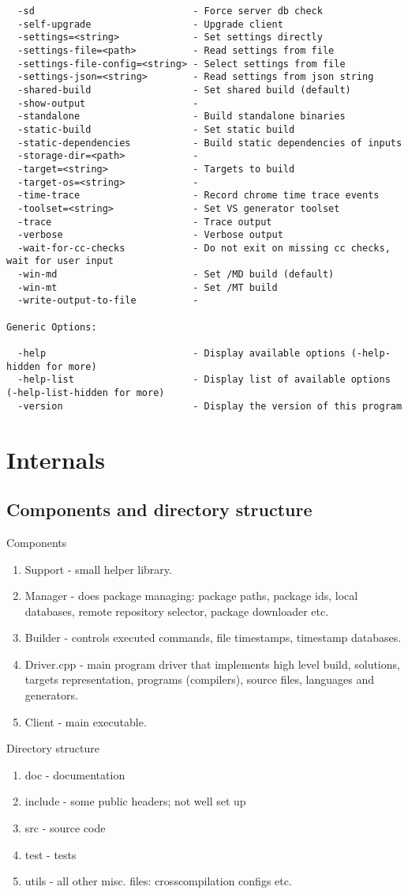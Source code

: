 \begin{verbatim}
  -sd                            - Force server db check
  -self-upgrade                  - Upgrade client
  -settings=<string>             - Set settings directly
  -settings-file=<path>          - Read settings from file
  -settings-file-config=<string> - Select settings from file
  -settings-json=<string>        - Read settings from json string
  -shared-build                  - Set shared build (default)
  -show-output                   -
  -standalone                    - Build standalone binaries
  -static-build                  - Set static build
  -static-dependencies           - Build static dependencies of inputs
  -storage-dir=<path>            -
  -target=<string>               - Targets to build
  -target-os=<string>            -
  -time-trace                    - Record chrome time trace events
  -toolset=<string>              - Set VS generator toolset
  -trace                         - Trace output
  -verbose                       - Verbose output
  -wait-for-cc-checks            - Do not exit on missing cc checks, wait for user input
  -win-md                        - Set /MD build (default)
  -win-mt                        - Set /MT build
  -write-output-to-file          -

Generic Options:

  -help                          - Display available options (-help-hidden for more)
  -help-list                     - Display list of available options (-help-list-hidden for more)
  -version                       - Display the version of this program
\end{verbatim}





\section{Internals}
\subsection{Components and directory structure}

Components

\begin{enumerate}
\item
Support - small helper library.
\item
Manager - does package managing: package paths, package ids, local databases, remote repository selector, package downloader etc.
\item
Builder - controls executed commands, file timestamps, timestamp databases.
\item
Driver.cpp - main program driver that implements high level build, solutions, targets representation, programs (compilers), source files, languages and generators.
\item
Client - main executable.
\end{enumerate}

Directory structure

\begin{enumerate}
\item
doc - documentation
\item
include - some public headers; not well set up
\item
src - source code
\item
test - tests
\item
utils - all other misc. files: crosscompilation configs etc.
\end{enumerate}
